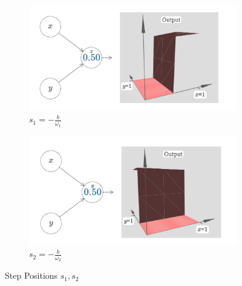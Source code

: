 \documentclass{article}
\begin{document}
\begin{figure}[H]
    \centering
     \begin{subfigure}[b]{0.5\textwidth}
     \centering
         \includegraphics[width=\textwidth]{Images/2/12.png}
         \caption{$s_1=-\frac{b}{\omega_1}$}
         \label{fig:y equals x}
     \end{subfigure}
     \hfill
     
     \begin{subfigure}[b]{0.5\textwidth}
     \centering
         \includegraphics[width = \textwidth]{Images/2/13.png}
         \caption{$s_2=-\frac{b}{\omega_2}$}
         \label{fig:three sin x}
     \end{subfigure}
     \caption{Step Positions $s_1,s_2$}
    \label{fig:figure14}
\end{figure}
\newpage
\end{document}
